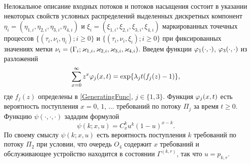\documentclass[a4paper,12pt,russian]{extarticle}
\newcommand{\ga}[1]{\Gamma^{\left( #1 \right)} }
\begin{document}
Нелокальное описание входных потоков и потоков насыщения состоит в указании некоторых свойств условных распределений выделенных дискретных компонент $\eta_i=(\eta_{1,i},\eta_{2,i}, \eta_{3,i}, \eta_{4,i})$ и $\xi_i=(\xi_{1,i}, \xi_{2,i}, \xi_{3,i}, \xi_{4,i})$ маркированных точечных процессов \linebreak $\{(\tau_i, \nu_i, \eta_i); i\geqslant 0\}$ и $\{(\tau_i, \nu_i, \xi_i); i\geqslant 0\}$ при фиксированных значениях метки $\nu_i = (\Gamma_i;\varkappa_{1,i},\varkappa_{2,i},\varkappa_{3,i},\varkappa_{4,i})$. 
Введем функции $\varphi_1(\cdot,\cdot)$, $\varphi_3(\cdot,\cdot)$ из разложений 
\begin{equation*}
\sum_{x=0}^{\infty} z^x\varphi_j(x,t) = \exp\{\lambda_j t (f_j(z)-1)\},
\end{equation*}
где $f_j(z)$ определены в \eqref{GeneratingFunc}, $j \in \{1,3\}$. Функция $\varphi_j(x,t)$ есть вероятность поступления $x=0$, $1$, $\ldots$ требований по потоку $\Pi_j$ за время $t \geqslant 0$. Функцию $\psi(\cdot,\cdot,\cdot)$ зададим формулой
\begin{equation*}
\psi(k;x,u)=C_x^k u^k (1-u)^{x-k}.
\end{equation*}
По своему смыслу $\psi(k;x,u)$ есть вероятность поступления $k$ требований по потоку $\Pi_2$ при условии, что очередь $O_4$ содержит $x$ требований и обслуживающее устройство находится в состоянии $\ga{k,r}$, так что $u=p_{k,r}$.
\end{document}
